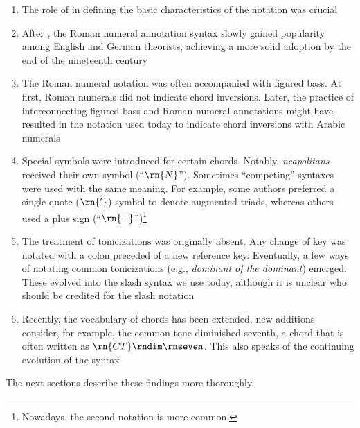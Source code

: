 \begin{enumerate}
    \item The role of \textcite{weber1817versuch} in
    defining the basic characteristics of the notation was
    crucial
    \item After \textcite{weber1817versuch}, the Roman
    numeral annotation syntax slowly gained popularity among
    English and German theorists, achieving a more solid
    adoption by the end of the nineteenth century
    \item The Roman numeral notation was often accompanied
    with figured bass. At first, Roman numerals did not
    indicate chord inversions. Later, the practice of
    interconnecting figured bass and Roman numeral
    annotations might have resulted in the notation used
    today to indicate chord inversions with Arabic numerals
    \item Special symbols were introduced for certain
    chords. Notably, \emph{neapolitans} received their own
    symbol (``$\rn{N}$''). Sometimes ``competing'' syntaxes
    were used with the same meaning. For example, some
    authors preferred a single quote ($\rn{'}$) symbol to
    denote augmented triads, whereas others used a plus sign
    (``$\rn{+}$'')\footnote{Nowadays, the second notation is
    more common.}
    \item The treatment of tonicizations was originally
    absent. Any change of key was notated with a colon
    preceded of a new reference key. Eventually, a few ways
    of notating common tonicizations (e.g., \emph{dominant
    of the dominant}) emerged. These evolved into the slash
    syntax we use today, although it is unclear who should
    be credited for the slash notation
    \item Recently, the vocabulary of chords has been
    extended, new additions consider, for example, the
    common-tone diminished seventh, a chord that is often
    written as $\rn{CT}\rndim\rnseven$. This also speaks of
    the continuing evolution of the syntax
\end{enumerate}

The next sections describe these findings more thoroughly.
